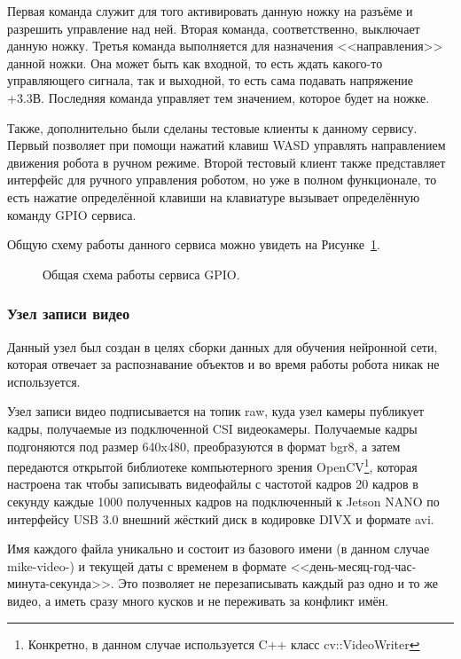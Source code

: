 Первая команда служит для того активировать данную ножку на разъёме и разрешить управление над ней. Вторая команда, соответственно, выключает данную ножку. Третья команда выполняется для назначения <<направления>> данной ножки. Она может быть как входной, то есть ждать какого-то управляющего сигнала, так и выходной, то есть сама подавать напряжение +3.3В. Последняя команда управляет тем значением, которое будет на ножке\cite{jetson-nano-gpio}.

Также, дополнительно были сделаны тестовые клиенты к данному сервису. Первый позволяет при помощи нажатий клавиш WASD управлять направлением движения робота в ручном режиме. Второй тестовый клиент также представляет интерфейс для ручного управления роботом, но уже в полном функционале, то есть нажатие определённой клавиши на клавиатуре вызывает определённую команду GPIO сервиса.

Общую схему работы данного сервиса можно увидеть на Рисунке~\ref{fig:service-gpio}.

\begin{figure}[ht]
  \caption{Общая схема работы сервиса GPIO.}\label{fig:service-gpio}
\end{figure}

\subsubsection{Узел записи видео}
Данный узел был создан в целях сборки данных для обучения нейронной сети, которая отвечает за распознавание объектов и во время работы робота никак не используется. 

Узел записи видео подписывается на топик raw, куда узел камеры публикует кадры, получаемые из подключенной CSI видеокамеры. Получаемые кадры подгоняются под размер 640x480, преобразуются в формат bgr8, а затем передаются открытой библиотеке компьютерного зрения OpenCV\footnote{Конкретно, в данном случае используется C++ класс cv::VideoWriter}, которая настроена так чтобы записывать видеофайлы с частотой кадров 20 кадров в секунду каждые 1000 полученных кадров на подключенный к Jetson NANO по интерфейсу USB 3.0 внешний жёсткий диск в кодировке DIVX и формате avi. 

Имя каждого файла уникально и состоит из базового имени (в данном случае mike-video-) и текущей даты с временем в формате <<день-месяц-год-час-минута-секунда>>. Это позволяет не перезаписывать каждый раз одно и то же видео, а иметь сразу много кусков и не переживать за конфликт имён. 


